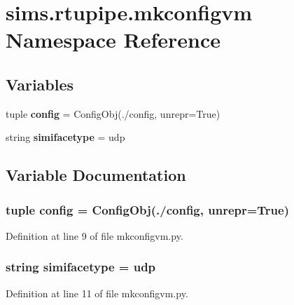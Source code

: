 \section{sims.\+rtupipe.\+mkconfigvm Namespace Reference}
\label{namespacesims_1_1rtupipe_1_1mkconfigvm}
\subsection*{Variables}
\begin{DoxyCompactItemize}
\item 
tuple {\bf config} = Config\+Obj(\textquotesingle{}./config\textquotesingle{}, unrepr=True)
\item 
string {\bf simifacetype} = \textquotesingle{}udp\textquotesingle{}
\end{DoxyCompactItemize}


\subsection{Variable Documentation}
\subsubsection[{config}]{\setlength{\rightskip}{0pt plus 5cm}tuple config = Config\+Obj(\textquotesingle{}./config\textquotesingle{}, unrepr=True)}\label{namespacesims_1_1rtupipe_1_1mkconfigvm_ad5f91786d7c873886a576621a2c1b0b5}


Definition at line 9 of file mkconfigvm.\+py.

\subsubsection[{simifacetype}]{\setlength{\rightskip}{0pt plus 5cm}string simifacetype = \textquotesingle{}udp\textquotesingle{}}\label{namespacesims_1_1rtupipe_1_1mkconfigvm_a7f5f5e89422cd15dfc1af6d7593d69c7}


Definition at line 11 of file mkconfigvm.\+py.

